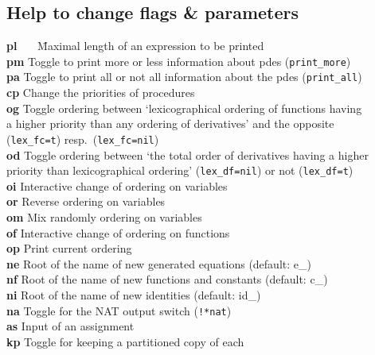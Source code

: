 \documentclass[12pt]{article}
\begin{document}
\subsection{Help to change flags \& parameters} 
\begin{tabbing}
  {\bf pl} \ \ \ \= Maximal length of an expression to be printed  \\
  {\bf pm}   \> Toggle to print more or less information about 
                        pdes ({\tt print\_more})    \\
  {\bf pa}   \> Toggle to print all or not all information 
                        about the pdes ({\tt print\_all}) \\
  {\bf cp}   \> Change the priorities of procedures   \\
  {\bf og}   \> Toggle ordering between `lexicographical 
                ordering of functions having\\
             \> a higher priority than any ordering of
                derivatives' and the opposite \\
             \> ({\tt lex\_fc=t}) resp.\ ({\tt lex\_fc=nil}) \\
  {\bf od}   \> Toggle ordering between `the total order
                of derivatives having a higher\\
             \> priority than lexicographical ordering' 
                ({\tt lex\_df=nil}) or not ({\tt lex\_df=t}) \\
  {\bf oi}   \> Interactive change of ordering on variables \\
  {\bf or}   \> Reverse ordering on variables \\
  {\bf om}   \> Mix randomly ordering on variables \\
  {\bf of}   \> Interactive change of ordering on functions     \\
  {\bf op}   \> Print current ordering  \\
  {\bf ne}   \> Root of the name of new generated equations
                        (default: e\_) \\
  {\bf nf}   \> Root of the name of new functions and constants
                        (default: c\_) \\
  {\bf ni}   \> Root of the name of new identities
                        (default: id\_) \\
  {\bf na}   \> Toggle for the NAT output switch ({\tt !*nat}) \\
  {\bf as}   \> Input of an assignment          \\
  {\bf kp}   \> Toggle for keeping a partitioned copy of each

\end{tabbing}
\end{document}
